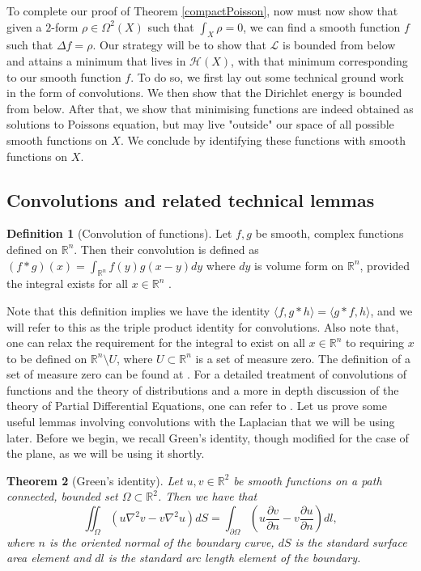 \documentclass[11pt]{report}
\newtheorem{thm}{Theorem}[section]
\theoremstyle{definition}
\newtheorem{defn}[thm]{Definition}
\begin{document}
To complete our proof of Theorem \ref{compactPoisson}, now must now show that given a $2$-form $\rho \in \Omega^2(X)$ such that $\int_X \rho = 0$, we can find a smooth function $f$ such that $\Delta f = \rho$. Our strategy will be to show that $\mathcal{L}$ is bounded from below and attains a minimum that lives in $\mathcal{H}(X)$, with that minimum corresponding to our smooth function $f$. To do so, we first lay out some technical ground work in the form of convolutions. We then show that the Dirichlet energy is bounded from below. After that, we show that minimising functions are indeed obtained as solutions to Poissons equation, but may live "outside" our space of all possible smooth functions on $X$. We conclude by identifying these functions with smooth functions on $X$.

\subsection{Convolutions and related technical lemmas}
\begin{defn}[Convolution of functions]\label{ConvolutionDefn}
  Let $f,g$ be smooth, complex functions defined on $\mathbb{R}^n$. Then their convolution is defined as $(f * g)(x) = \int_{\mathbb{R}^n}f(y)g(x-y)dy$ where $dy$ is volume form on $\mathbb{R}^n$, provided the integral exists for all $x \in \mathbb{R}^n$ .
\end{defn}
Note that this definition implies we have the identity $\langle f, g*h \rangle = \langle g*f, h \rangle$, and we will refer to this as the triple product identity for convolutions. Also note that, one can relax the requirement for the integral to exist on all $x \in \mathbb{R}^n$ to requiring $x$ to be defined on $\mathbb{R}^n\setminus{U}$, where $U \subset \mathbb{R}^n$ is a set of measure zero. The definition of a set of measure zero can be found at \cite[p.50]{spivak}.
For a detailed treatment of convolutions of functions and the theory of distributions and a more in depth discussion of the theory of Partial Differential Equations, one can refer to \cite[(Chapter 6)]{rudin}. 
Let us prove some useful lemmas involving convolutions with the Laplacian that we will be using later. Before we begin, we recall Green's identity, though modified for the case of the plane, as we will be using it shortly. 
\begin{thm}[Green's identity]
  Let $u,v \in \mathbb{R}^2$ be smooth functions on a path connected, bounded set $\Omega \subset \mathbb{R}^2$. Then we have that  
  \[\iint_{\Omega} (u \nabla^2 v - v \nabla^2 u) dS= \int_{\partial \Omega} \left(u \frac{\partial v}{\partial n} - v \frac{\partial u}{\partial n}\right) dl, \] 
  where $n$ is the oriented normal of the boundary curve, $dS$ is the standard surface area element and $dl$ is the standard arc length element of the boundary.
\end{thm}
\end{document}

